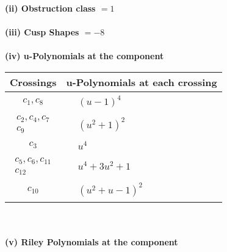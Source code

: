 \documentclass[1p]{elsarticle_modified}
\theoremstyle{definition}
\begin{document}
\flushleft \textbf{(ii) Obstruction class $= 1$}\\~\\
\flushleft \textbf{(iii) Cusp Shapes $= -8$}\\~\\
\newpage\renewcommand{\arraystretch}{1}
\flushleft \textbf{(iv) u-Polynomials at the component}\newline \\
\begin{tabular}{m{50pt}|m{274pt}}
Crossings & \hspace{64pt}u-Polynomials at each crossing \\
\hline $$\begin{aligned}c_{1},c_{8}\end{aligned}$$&$\begin{aligned}
&(u-1)^4
\end{aligned}$\\
\hline $$\begin{aligned}c_{2},c_{4},c_{7}\\c_{9}\end{aligned}$$&$\begin{aligned}
&(u^2+1)^2
\end{aligned}$\\
\hline $$\begin{aligned}c_{3}\end{aligned}$$&$\begin{aligned}
&u^4
\end{aligned}$\\
\hline $$\begin{aligned}c_{5},c_{6},c_{11}\\c_{12}\end{aligned}$$&$\begin{aligned}
&u^4+3 u^2+1
\end{aligned}$\\
\hline $$\begin{aligned}c_{10}\end{aligned}$$&$\begin{aligned}
&(u^2+u-1)^2
\end{aligned}$\\
\hline
\end{tabular}\\~\\
\newpage\renewcommand{\arraystretch}{1}
\flushleft \textbf{(v) Riley Polynomials at the component}\newline \\
\end{document}
